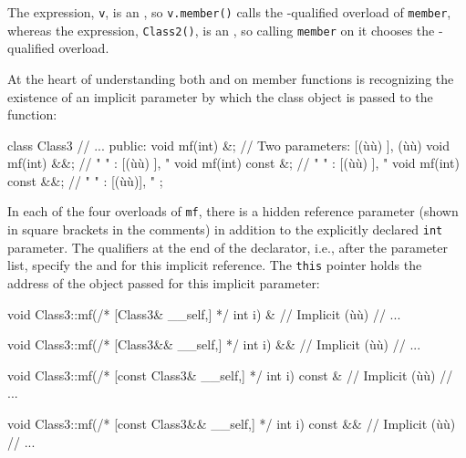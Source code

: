 \noindent The expression, \lstinline!v!, is an , so \lstinline!v.member()!
calls the -qualified overload of \lstinline!member!, whereas
the expression, \lstinline!Class2()!, is an , so calling
\lstinline!member! on it chooses the -qualified overload.

At the heart of understanding both  and
 on member functions is recognizing the existence
of an implicit parameter by which the class object is passed to the
function:

\begin{emcppslisting}[emcppsbatch=e1]
class Class3
{
    // ...
public:
    void mf(int) &;         // Two parameters: [(ù{}ù)       ], (ù{}ù)
    void mf(int) &&;        //  "       "    : [(ù{}ù)      ],   "
    void mf(int) const &;   //  "       "    : [(ù{}ù) ],   "
    void mf(int) const &&;  //  "       "    : [(ù{}ù)],   "
};
\end{emcppslisting}
    

\noindent In each of the four overloads of \lstinline!mf!, there is a hidden
reference parameter (shown in square brackets in the comments) in
addition to the explicitly declared \lstinline!int! parameter. The
qualifiers at the end of the declarator, i.e., after the parameter list,
specify the  and  for this
implicit reference. The \lstinline!this! pointer holds the address of the
object passed for this implicit parameter:

\begin{emcppslisting}[emcppsbatch=e1]
void Class3::mf(/* [Class3& __self,] */ int i) &
{
    // Implicit (ù{}ù)
    // ...
}

void Class3::mf(/* [Class3&& __self,] */ int i) &&
{
    // Implicit (ù{}ù)
    // ...
}

void Class3::mf(/* [const Class3& __self,] */ int i) const &
{
    // Implicit (ù{}ù)
    // ...
}

void Class3::mf(/* [const Class3&& __self,] */ int i) const &&
{
    // Implicit (ù{}ù)
    // ...
}
\end{emcppslisting}
    


